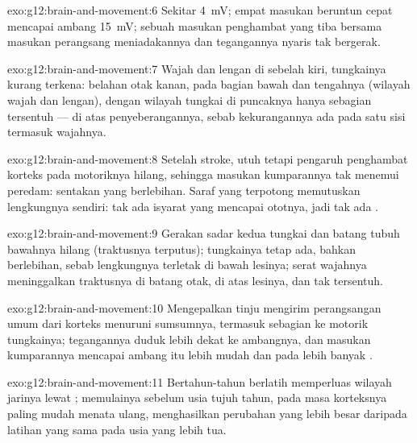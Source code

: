 \begin{solution}{exo:g12:brain-and-movement:6}
Sekitar \qty{4}{mV}; empat masukan beruntun cepat mencapai ambang
\qty{15}{mV}; sebuah masukan penghambat yang tiba bersama masukan
perangsang meniadakannya dan tegangannya nyaris tak bergerak.
\end{solution}

\begin{solution}{exo:g12:brain-and-movement:7}
Wajah dan lengan di sebelah kiri, tungkainya kurang terkena:  belahan otak kanan, pada bagian bawah dan tengahnya (wilayah
wajah dan lengan), dengan wilayah tungkai di puncaknya hanya sebagian
tersentuh --- di atas penyeberangannya, sebab kekurangannya ada pada
satu sisi termasuk wajahnya.
\end{solution}

\begin{solution}{exo:g12:brain-and-movement:8}
Setelah stroke,  utuh tetapi pengaruh penghambat
korteks pada  motoriknya hilang, sehingga masukan kumparannya tak
menemui peredam: sentakan yang berlebihan. Saraf yang terpotong
memutuskan lengkungnya sendiri: tak ada isyarat yang mencapai ototnya,
jadi tak ada .
\end{solution}

\begin{solution}{exo:g12:brain-and-movement:9}
Gerakan sadar kedua tungkai dan batang tubuh bawahnya hilang (traktusnya
terputus);  tungkainya tetap ada, bahkan berlebihan, sebab
lengkungnya terletak di bawah lesinya; serat wajahnya meninggalkan
traktusnya di batang otak, di atas lesinya, dan tak tersentuh.
\end{solution}

\begin{solution}{exo:g12:brain-and-movement:10}
Mengepalkan tinju mengirim perangsangan umum dari korteks menuruni
sumsumnya, termasuk sebagian ke  motorik tungkainya; tegangannya
duduk lebih dekat ke ambangnya, dan masukan kumparannya mencapai ambang
itu lebih mudah dan pada lebih banyak .
\end{solution}

\begin{solution}{exo:g12:brain-and-movement:11}
Bertahun-tahun berlatih memperluas wilayah jarinya lewat ;
memulainya sebelum usia tujuh tahun, pada masa korteksnya paling mudah
menata ulang, menghasilkan perubahan yang lebih besar daripada latihan
yang sama pada usia yang lebih tua.
\end{solution}

